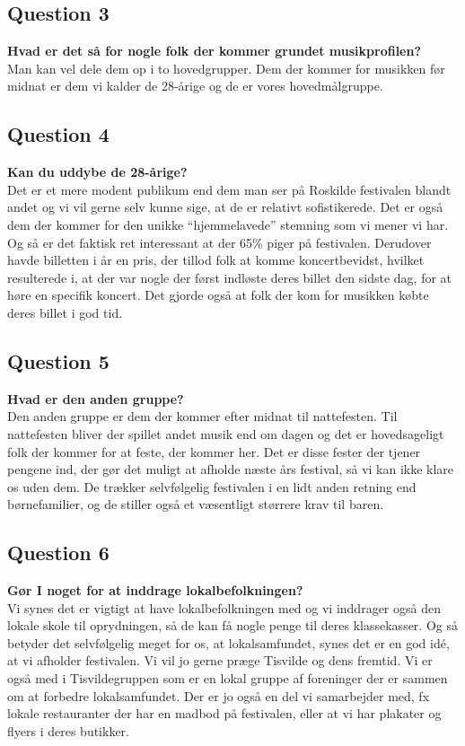 \subsection{Question 3}
\label{i2q3}
\noindent \textbf{Hvad er det så for nogle folk der kommer grundet musikprofilen?} \\
Man kan vel dele dem op i to hovedgrupper. Dem der kommer for musikken før midnat er dem vi kalder de 28-årige og de er vores hovedmålgruppe. 

\subsection{Question 4}
\label{i2q4}
\noindent \textbf{Kan du uddybe de 28-årige?} \\
Det er et mere modent publikum end dem man ser på Roskilde festivalen blandt andet og vi vil gerne selv kunne sige, at de er relativt sofistikerede. Det er også dem der kommer for den unikke “hjemmelavede” stemning som vi mener vi har. Og så er det faktisk ret interessant at der 65\% piger på festivalen. Derudover havde billetten i år en pris, der tillod folk at komme koncertbevidst, hvilket resulterede i, at der var nogle der først indløste deres billet den sidste dag, for at høre en specifik koncert. Det gjorde også at folk der kom for musikken købte deres billet i god tid.

\subsection{Question 5}
\label{i2q5}
\noindent \textbf{Hvad er den anden gruppe?} \\
Den anden gruppe er dem der kommer efter midnat til nattefesten. Til nattefesten bliver der spillet andet musik end om dagen og det er hovedsageligt folk der kommer for at feste, der kommer her. Det er disse fester der tjener pengene ind, der gør det muligt at afholde næste års festival, så vi kan ikke klare os uden dem. De trækker selvfølgelig festivalen i en lidt anden retning end børnefamilier, og de stiller også et væsentligt størrere krav til baren.

\subsection{Question 6}
\label{i2q6}
\noindent \textbf{Gør I noget for at inddrage lokalbefolkningen?} \\
Vi synes det er vigtigt at have lokalbefolkningen med og vi inddrager også den lokale skole til oprydningen, så de kan få nogle penge til deres klassekasser. Og så betyder det selvfølgelig meget for os, at lokalsamfundet, synes det er en god idé, at vi afholder festivalen. Vi vil jo gerne præge Tisvilde og dens fremtid. Vi er også med i Tisvildegruppen som er en lokal gruppe af foreninger der er sammen om at forbedre lokalsamfundet. Der er jo også en del vi samarbejder med, fx lokale restauranter der har en madbod på festivalen, eller at vi har plakater og flyers i deres butikker.

